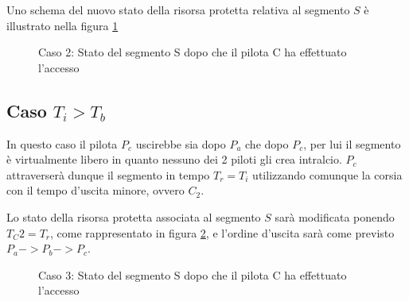 \documentclass[a4paper,11pt, twoside]{book}
\begin{document}
	Uno schema del nuovo stato della risorsa protetta relativa al segmento $S$ è illustrato nella figura 
	\ref{fgr:AccessoSegmentiCaso2}

	\begin{figure}[ht]
	  \centering
	  \caption{Caso 2: Stato del segmento S dopo che il pilota C ha effettuato l'accesso}
	  \label{fgr:AccessoSegmentiCaso2}
	\end{figure}
      
      \subsection{Caso $T_i > T_b$}
	In questo caso il pilota $P_c$ uscirebbe sia dopo $P_a$ che dopo $P_c$, per lui il segmento
	è virtualmente libero in quanto nessuno dei 2 piloti gli crea intralcio. $P_c$ attraverserà
	dunque il segmento in tempo $T_r = T_i$ utilizzando comunque la corsia con il tempo d'uscita minore,
	ovvero $C_2$.
	
	Lo stato della risorsa protetta associata al segmento $S$ sarà modificata ponendo $T_C2 = T_r$,
	come rappresentato in figura \ref{fgr:AccessoSegmentiCaso3}, e l'ordine d'uscita sarà come previsto
	$P_a -> P_b -> P_c$.
      
	\begin{figure}[ht]
	  \centering
	  \caption{Caso 3: Stato del segmento S dopo che il pilota C ha effettuato l'accesso}
	  \label{fgr:AccessoSegmentiCaso3}
	\end{figure}
	    
\end{document}
